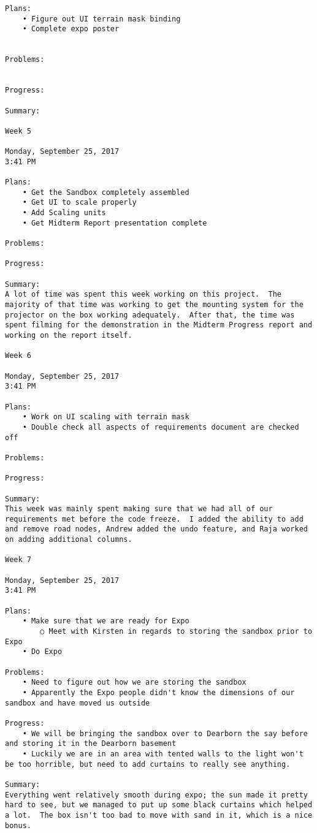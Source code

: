 \begin{lstlisting}
Plans:
	• Figure out UI terrain mask binding
	• Complete expo poster
	

Problems:
	

Progress:

Summary:

Week 5

Monday, September 25, 2017
3:41 PM

Plans:
	• Get the Sandbox completely assembled
	• Get UI to scale properly
	• Add Scaling units
	• Get Midterm Report presentation complete

Problems:

Progress:

Summary:
A lot of time was spent this week working on this project.  The majority of that time was working to get the mounting system for the projector on the box working adequately.  After that, the time was spent filming for the demonstration in the Midterm Progress report and working on the report itself.

Week 6

Monday, September 25, 2017
3:41 PM

Plans:
	• Work on UI scaling with terrain mask
	• Double check all aspects of requirements document are checked off

Problems:

Progress:

Summary:
This week was mainly spent making sure that we had all of our requirements met before the code freeze.  I added the ability to add and remove road nodes, Andrew added the undo feature, and Raja worked on adding additional columns.

Week 7

Monday, September 25, 2017
3:41 PM

Plans:
	• Make sure that we are ready for Expo
		○ Meet with Kirsten in regards to storing the sandbox prior to Expo
	• Do Expo

Problems:
	• Need to figure out how we are storing the sandbox
	• Apparently the Expo people didn't know the dimensions of our sandbox and have moved us outside

Progress:
	• We will be bringing the sandbox over to Dearborn the say before and storing it in the Dearborn basement
	• Luckily we are in an area with tented walls to the light won't be too horrible, but need to add curtains to really see anything.

Summary:
Everything went relatively smooth during expo; the sun made it pretty hard to see, but we managed to put up some black curtains which helped a lot.  The box isn't too bad to move with sand in it, which is a nice bonus.


\end{lstlisting}
